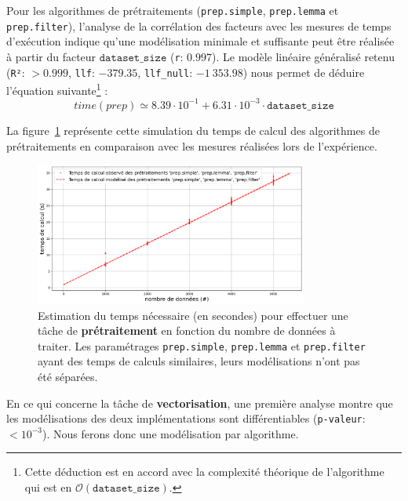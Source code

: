 			Pour les algorithmes de prétraitements (\texttt{prep.simple}, \texttt{prep.lemma} et \texttt{prep.filter}), l'analyse de la corrélation des facteurs avec les mesures de temps d'exécution indique qu'une modélisation minimale et suffisante peut être réalisée à partir du facteur $\texttt{dataset\_size}$ (\texttt{r}: $0.997$).
			Le modèle linéaire généralisé retenu (\texttt{R²}: $> 0.999$, \texttt{llf}: $-379.35$, \texttt{llf\_null}: $-1~353.98$) nous permet de déduire l'équation suivante\footnote{Cette déduction est en accord avec la complexité théorique de l'algorithme qui est en $ \mathcal{O}(\texttt{dataset\_size}) $.} :
			\begin{equation}
				time(prep)
				\simeq 8.39\cdot10^{-1} + 6.31\cdot10^{-3}\cdot\texttt{dataset\_size}
			\end{equation}
			
			La figure~\ref{figure:4.3.1-ETUDE-COUTS-TEMPS-CALCUL-MODELISATION-PREPROCESSING} représente cette simulation du temps de calcul des algorithmes de prétraitements en comparaison avec les mesures réalisées lors de l'expérience.
			\newline
			\begin{figure}[!htb]
				\centering
				\includegraphics[width=0.8\textwidth]{figures/etude-temps-calcul-modelisation-1prep}
				\caption{Estimation du temps nécessaire (en secondes) pour effectuer une tâche de \textbf{prétraitement} en fonction du nombre de données à traiter. Les paramétrages \texttt{prep.simple}, \texttt{prep.lemma} et \texttt{prep.filter} ayant des temps de calculs similaires, leurs modélisations n'ont pas été séparées.}
				\label{figure:4.3.1-ETUDE-COUTS-TEMPS-CALCUL-MODELISATION-PREPROCESSING}
			\end{figure}
			
			
			En ce qui concerne la tâche de \textbf{vectorisation}, une première analyse montre que les modélisations des deux implémentations sont différentiables  (\texttt{p-valeur}: $< 10^{-3}$). Nous ferons donc une modélisation par algorithme.
		
